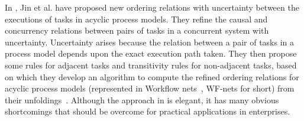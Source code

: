 \documentclass{llncs}
\begin{document}
In \cite{jin2014computing}, Jin et al. have proposed new ordering relations with uncertainty between the executions of tasks in acyclic process models. They refine the causal and concurrency relations between pairs of tasks in a concurrent system with uncertainty. Uncertainty arises because the relation between a pair of tasks in a process model depends upon the exact execution path taken. They then propose some rules for adjacent tasks and transitivity rules for non-adjacent tasks, based on which they develop an algorithm to compute the refined ordering relations for acyclic process models (represented in Workflow nets~\cite{van1998application}, WF-nets for short) from their unfoldings~\cite{mcmillan1995technique,esparza2002improvement}. Although the approach in \cite{jin2014computing} is elegant, it has many obvious shortcomings that should be overcome for practical applications in enterprises.
\end{document}
